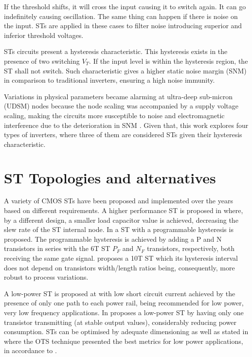 \documentclass[pgmicro,mestrado,english]{iiufrgs}
\begin{document}
If the threshold shifts, it will cross the input causing it to switch again. It can go indefinitely causing oscillation. The same thing can happen if there is noise on the input. STs are applied in these cases to filter noise introducing superior and inferior threshold voltages.

STs circuits present a hysteresis characteristic. This hysteresis exists in the presence of two switching $V_T$. If the input level is within the hysteresis region, the ST shall not switch. Such characteristic gives a higher static noise margin (SNM) in comparison to traditional inverters, ensuring a high noise immunity.

 Variations in physical parameters became alarming at ultra-deep sub-micron (UDSM) nodes because the node scaling was accompanied by a supply voltage scaling, making the circuits more susceptible to noise and electromagnetic interference due to the deterioration in SNM \cite{pal2018circuit}. Given that, this work explores four types of inverters, where three of them are considered STs given their hysteresis characteristic.

 \section{ST Topologies and alternatives}

A variety of CMOS STs have been proposed and implemented over the years based on different requirements. A higher performance ST is proposed in \cite{steyaert1986novel} where, by a different design, a smaller load capacitor value is achieved, decreasing the slew rate of the ST internal node. In \cite{pfister1992novel} a ST with a programmable hysteresis is proposed. The programmable hysteresis is achieved by adding a P and N transistors in series with the 6T ST $P_F$ and $N_F$ transistors, respectively, both receiving the same gate signal. \cite{kim1993new} proposes a 10T ST which its hysteresis interval does not depend on transistors width/length ratios being, consequently, more robust to process variations.

 A low-power ST is proposed at \cite{al2002low} with low short circuit current achieved by the presence of only one path to each power rail, being recommended for low power, very low frequency applications. In \cite{pedroni2005low} proposes a low-power ST by having only one transistor transmitting (at stable output values), considerably reducing power consumption. STs can be optimised by adequate dimensioning as well as stated in \cite{tache2018reliability} where the OTS technique presented the best metrics for low power applications, in accordance to \cite{zimpeck2016finfet}.
\end{document}
